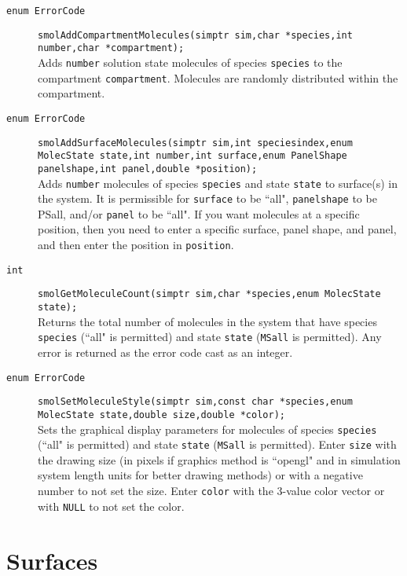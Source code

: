 \documentclass {book}
\begin{document}
\begin{description}
\item[\texttt{enum ErrorCode}]
\texttt{smolAddCompartmentMolecules(simptr sim,char *species,int number,char *compartment);}
\hfill \\
Adds \texttt{number} solution state molecules of species \texttt{species} to the compartment \texttt{compartment}.  Molecules are randomly distributed within the compartment.

\item[\texttt{enum ErrorCode}]
\texttt{smolAddSurfaceMolecules(simptr sim,int speciesindex,enum MolecState state,int number,int surface,enum PanelShape panelshape,int panel,double *position);}
\hfill \\
Adds \texttt{number} molecules of species \texttt{species} and state \texttt{state} to surface(s) in the system.  It is permissible for \texttt{surface} to be ``all", \texttt{panelshape} to be PSall, and/or \texttt{panel} to be ``all".  If you want molecules at a specific position, then you need to enter a specific surface, panel shape, and panel, and then enter the position in \texttt{position}.

\item[\texttt{int}]
\texttt{smolGetMoleculeCount(simptr sim,char *species,enum MolecState state);}
\hfill \\
Returns the total number of molecules in the system that have species \texttt{species} (``all" is permitted) and state \texttt{state} (\texttt{MSall} is permitted).  Any error is returned as the error code cast as an integer.

\item[\texttt{enum ErrorCode}]
\texttt{smolSetMoleculeStyle(simptr sim,const char *species,enum MolecState state,double size,double *color);}
\hfill \\
Sets the graphical display parameters for molecules of species \texttt{species} (``all" is permitted) and state \texttt{state} (\texttt{MSall} is permitted).  Enter \texttt{size} with the drawing size (in pixels if graphics method is ``opengl" and in simulation system length units for better drawing methods) or with a negative number to not set the size.  Enter \texttt{color} with the 3-value color vector or with \texttt{NULL} to not set the color.

\end{description}


\section{Surfaces}
\end{document}
